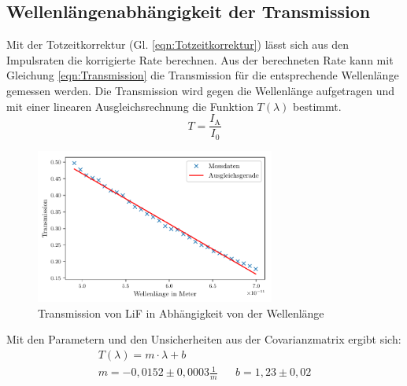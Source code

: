 \subsection{Wellenlängenabhängigkeit der Transmission}
Mit der Totzeitkorrektur (Gl. \ref{eqn:Totzeitkorrektur}) lässt sich aus den Impulsraten die korrigierte Rate berechnen.
Aus der berechneten Rate kann mit Gleichung \ref{eqn:Transmission} die Transmission für die entsprechende Wellenlänge gemessen werden.
Die Transmission wird gegen die Wellenlänge aufgetragen und mit einer linearen Ausgleichsrechnung die Funktion $T(\lambda)$ bestimmt.
\begin{equation*}
    T = \frac{I_{\text{A}}}{I_0} \label{eqn:Transmission}
\end{equation*}
\begin{figure}[H]
    \centering
    \includegraphics[width=0.7\textwidth]{plots/Transmission.pdf}
    \caption{Transmission von LiF in Abhängigkeit von der Wellenlänge}
    \label{fig:Transmission}
\end{figure}
Mit den Parametern und den Unsicherheiten aus der Covarianzmatrix ergibt sich:
\begin{align*}
    T(\lambda) = m \cdot \lambda + b  \\
    m = -0,0152 \pm 0,0003 \frac{1}{m}&& b= 1,23 \pm 0,02 
\end{align*}

